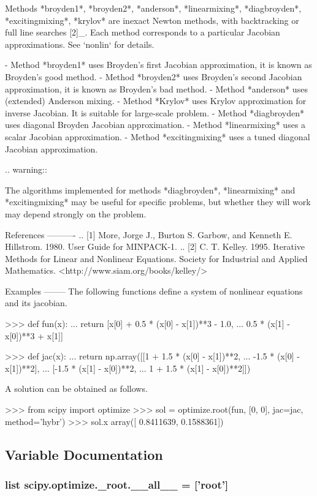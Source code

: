 \begin{DoxyVerb}
Methods *broyden1*, *broyden2*, *anderson*, *linearmixing*,
*diagbroyden*, *excitingmixing*, *krylov* are inexact Newton methods,
with backtracking or full line searches [2]_. Each method corresponds
to a particular Jacobian approximations. See `nonlin` for details.

- Method *broyden1* uses Broyden's first Jacobian approximation, it is
  known as Broyden's good method.
- Method *broyden2* uses Broyden's second Jacobian approximation, it
  is known as Broyden's bad method.
- Method *anderson* uses (extended) Anderson mixing.
- Method *Krylov* uses Krylov approximation for inverse Jacobian. It
  is suitable for large-scale problem.
- Method *diagbroyden* uses diagonal Broyden Jacobian approximation.
- Method *linearmixing* uses a scalar Jacobian approximation.
- Method *excitingmixing* uses a tuned diagonal Jacobian
  approximation.

.. warning::

    The algorithms implemented for methods *diagbroyden*,
    *linearmixing* and *excitingmixing* may be useful for specific
    problems, but whether they will work may depend strongly on the
    problem.

References
----------
.. [1] More, Jorge J., Burton S. Garbow, and Kenneth E. Hillstrom.
   1980. User Guide for MINPACK-1.
.. [2] C. T. Kelley. 1995. Iterative Methods for Linear and Nonlinear
    Equations. Society for Industrial and Applied Mathematics.
    <http://www.siam.org/books/kelley/>

Examples
--------
The following functions define a system of nonlinear equations and its
jacobian.

>>> def fun(x):
...     return [x[0]  + 0.5 * (x[0] - x[1])**3 - 1.0,
...             0.5 * (x[1] - x[0])**3 + x[1]]

>>> def jac(x):
...     return np.array([[1 + 1.5 * (x[0] - x[1])**2,
...                       -1.5 * (x[0] - x[1])**2],
...                      [-1.5 * (x[1] - x[0])**2,
...                       1 + 1.5 * (x[1] - x[0])**2]])

A solution can be obtained as follows.

>>> from scipy import optimize
>>> sol = optimize.root(fun, [0, 0], jac=jac, method='hybr')
>>> sol.x
array([ 0.8411639,  0.1588361])
\end{DoxyVerb}
 

\subsection{Variable Documentation}
\hypertarget{namespacescipy_1_1optimize_1_1__root_a172eef1e96392775fe745d3dd3732d55}{}
\subsubsection[{\+\_\+\+\_\+all\+\_\+\+\_\+}]{\setlength{\rightskip}{0pt plus 5cm}list scipy.\+optimize.\+\_\+root.\+\_\+\+\_\+all\+\_\+\+\_\+ = \mbox{[}'{\bf root}'\mbox{]}}\label{namespacescipy_1_1optimize_1_1__root_a172eef1e96392775fe745d3dd3732d55}
